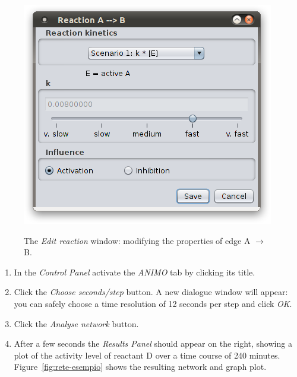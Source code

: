 \begin{figure}[!tpb]
\begin{minipage}{\textwidth}
\begin{center}
\includegraphics[width=.5\textwidth]{images/edit_reactionAB}\\
\caption{The \emph{Edit reaction} window: modifying the properties of edge A $\rightarrow$ B.}\label{fig:edit-reaction}
\end{center}
\end{minipage}
\end{figure}

\begin{enumerate}
\setcounter{enumi}{\value{miocounterperenumerate}}
\item In the \emph{Control Panel} activate the \emph{ANIMO} tab by clicking its title.
\item Click the \emph{Choose seconds/step} button. A new dialogue window will appear: you can
safely choose a time resolution of 12 seconds per step and click \emph{OK}.
\item Click the \emph{Analyse network} button.
\item After a few seconds the \emph{Results Panel} should appear on the right,
showing a plot of the activity level of reactant D over a time course of 240 minutes.
Figure~\ref{fig:rete-esempio} shows the resulting network and graph plot.
\end{enumerate}

